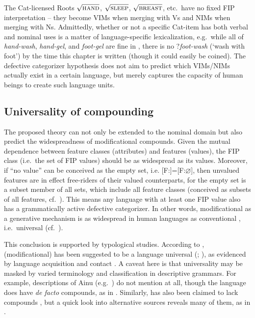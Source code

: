 \documentclass[output=paper]{langsci/langscibook}
\begin{document}
The Cat-licensed Roots $\sqrt{\textrm{\textsc{hand}}}$,
$\sqrt{\textrm{\textsc{sleep}}}$, $\sqrt{\textrm{\textsc{breast}}}$, etc.\ have
no fixed \gls{FIP} interpretation -- they become \glspl{VIM} when merging with V\textsubscript{\textsurd}s and N\glspl{IM} when
merging with N\textsubscript{\textsurd}s. Admittedly, whether or not a specific
Cat-item has both verbal and nominal uses is a matter of language-specific
lexicalization, e.g.\ while all of {\it hand-wash}, {\it hand-gel}, and {\it
foot-gel} are fine in , there is no ?{\it foot-wash} (`wash with
foot') by the time this chapter is written (though it could easily be coined).
The defective categorizer hypothesis does not aim to predict which
\glspl{VIM}/N\glspl{IM} actually exist in a certain language, but merely
captures the capacity of human beings to create such language units.

\subsection{Universality of compounding}\label{sec5.2}

The proposed theory can not only be extended to the nominal domain but also
predict the widespreadness of modificational compounds. Given the mutual
dependence between feature classes (attributes) and features (values), the
\gls{FIP} class (i.e.\ the set of \gls{FIP} values) should be as widespread as
its values. Moreover, if ``no value'' can be conceived as the empty set, i.e.
[F:\underline{\hspace{3mm}}]=[F:$\varnothing$], then unvalued features are in
effect free-riders of their valued counterparts, for the empty set is a subset
member of all sets, which include all feature classes (conceived as subsets of
all features, cf.\ ). This means any language with at least one
\gls{FIP} value also has a grammatically active defective categorizer. In other
words, modificational  as a generative mechanism is as widespread in
human languages as conventional , i.e.\ universal (cf.\
\citealt{Baker2003,Panagiotidis2015}).

This conclusion is supported by typological studies. According to
\citet[344]{Bauer2009}, (modificational) \isi{compounding} has been suggested to be a
language universal (\citealt[54--55]{FromkinEtal1996};
\citealt[2]{Libben2006}), as evidenced by language acquisition
\citep{Clark1993} and contact \citep{Plag2006}. A caveat here is that
universality may be masked by varied terminology and classification in
descriptive grammars. For example, descriptions of Ainu (e.g.\
\citealt{Refsing1986,Shibatani1990}) do not mention  at
all, though the language does have \emph{de facto} compounds, as in
\REF{ex:ainu}.  Similarly, \ili{Evenki} has also been claimed to lack compounds
\citep[308]{Nedjalkov1997}, but a quick look into alternative sources reveals
many of them, as in \REF{ex:evenki}.
\end{document}
